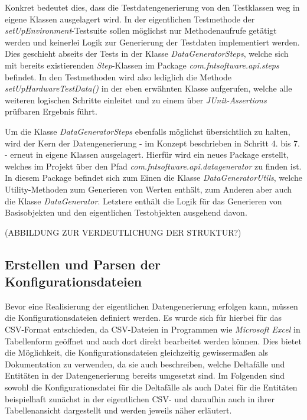 Konkret bedeutet dies, dass die Testdatengenerierung von den Testklassen weg in eigene Klassen ausgelagert wird. In der eigentlichen Testmethode der \textit{setUpEnvironment}-Testsuite sollen möglichst nur Methodenaufrufe getätigt werden und keinerlei Logik zur Generierung der Testdaten implementiert werden. Dies geschieht abseits der Tests in der Klasse \textit{DataGeneratorSteps}, welche sich mit bereits existierenden \textit{Step}-Klassen im Package \textit{com.fntsoftware.api.steps} befindet. In den Testmethoden wird also lediglich die Methode \textit{setUpHardwareTestData()} in der eben erwähnten Klasse aufgerufen, welche alle weiteren logischen Schritte einleitet und zu einem über \textit{JUnit-Assertions} prüfbaren Ergebnis führt.

Um die Klasse \textit{DataGeneratorSteps} ebenfalls möglichst übersichtlich zu halten, wird der Kern der Datengenerierung - im Konzept beschrieben in Schritt 4. bis 7. - erneut in eigene Klassen ausgelagert. Hierfür wird ein neues Package erstellt, welches im Projekt über den Pfad \textit{com.fntsoftware.api.datagenerator} zu finden ist. In diesem Package befindet sich zum Einen die Klasse \textit{DataGeneratorUtils}, welche Utility-Methoden zum Generieren von Werten enthält, zum Anderen aber auch die Klasse \textit{DataGenerator}. Letztere enthält die Logik für das Generieren von Basisobjekten und den eigentlichen Testobjekten ausgehend davon.

(ABBILDUNG ZUR VERDEUTLICHUNG DER STRUKTUR?)

\subsection{Erstellen und Parsen der Konfigurationsdateien}\label{subsec:config}
Bevor eine Realisierung der eigentlichen Datengenerierung erfolgen kann, müssen die Konfigurationsdateien definiert werden. Es wurde sich für hierbei für das \ac{CSV}-Format entschieden, da \ac{CSV}-Dateien in Programmen wie \textit{Microsoft Excel} in Tabellenform geöffnet und auch dort direkt bearbeitet werden können. \cite{excel:2022} Dies bietet die Möglichkeit, die Konfigurationsdateien gleichzeitig gewissermaßen als Dokumentation zu verwenden, da sie auch beschreiben, welche Deltafälle und Entitäten in der Datengenerierung bereits umgesetzt sind. Im Folgenden sind sowohl die Konfigurationsdatei für die Deltafälle als auch Datei für die Entitäten beispielhaft zunächst in der eigentlichen \ac{CSV}- und daraufhin auch in ihrer Tabellenansicht dargestellt und werden jeweils näher erläutert.

